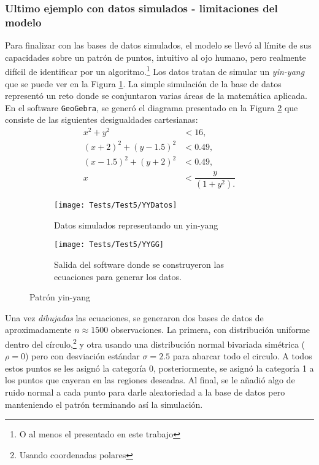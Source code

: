 \documentclass[../Main/Main.tex]{subfiles}
\begin{document}
\subsubsection*{Ultimo ejemplo con datos simulados - limitaciones del modelo}
Para finalizar con las  bases de datos simulados, el modelo se llevó al límite de sus capacidades sobre un patrón de puntos, intuitivo al ojo humano, pero realmente difícil de identificar por un algoritmo.\footnote{O al menos el presentado en este trabajo} Los datos tratan de simular un \textit{yin-yang} que se puede ver en la Figura \ref{fig:YYDatos}. La simple simulación de la base de datos representó un reto donde se conjuntaron varias áreas de la matemática aplicada. En el software \verb|GeoGebra|, se generó el diagrama presentado en la Figura \ref{fig:YYGG} que consiste de las siguientes desigualdades cartesianas:
\begin{align*}
	x^2 + y^2 &< 16, \\
	(x+2)^2 + (y-1.5)^2 &< 0.49, \\
	(x-1.5)^2 + (y+2)^2 &< 0.49, \\[4pt]
	x &< \dfrac{y}{(1+y^2).}
\end{align*}

\begin{figure}[h]
        \centering
        \begin{subfigure}[b]{0.45\textwidth}
            \centering
            \texttt{[image: Tests/Test5/YYDatos]}
            \caption{Datos simulados representando un yin-yang}   
            \label{fig:YYDatos}
        \end{subfigure}
        \hfill
        \begin{subfigure}[b]{0.45\textwidth}  
            \centering 
            \texttt{[image: Tests/Test5/YYGG]}
            \caption{Salida del software donde se construyeron las ecuaciones para generar los datos.}
            \label{fig:YYGG}
        \end{subfigure}
        \caption{Patrón yin-yang}
        \label{fig:YYInitialPlots}
\end{figure}
Una vez \textit{dibujadas} las ecuaciones, se generaron dos bases de datos de aproximadamente $n \approx 1500$ observaciones. La primera, con distribución uniforme dentro del círculo,\footnote{Usando coordenadas polares} y otra usando una distribución normal bivariada simétrica ($\rho = 0$) pero con desviación estándar $\sigma = 2.5$ para abarcar todo el circulo. A todos estos puntos se les asignó la categoría 0, posteriormente, se asignó la categoría 1 a los puntos que cayeran en las regiones deseadas. Al final, se le añadió algo de ruido normal a cada punto para darle aleatoriedad a la base de datos pero manteniendo el patrón terminando así la simulación.
\end{document}
